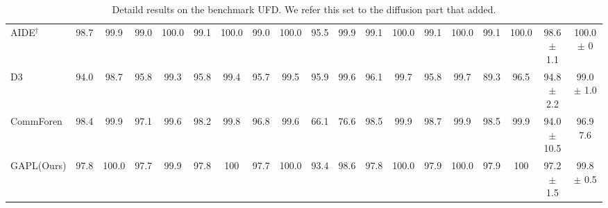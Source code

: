 \begin{table}[!t]
{\begin{tabular}{l cc cc cc cc cc cc cc cc cc}
AIDE$^\dagger$ \cite{yan2024sanity} & 98.7 & 99.9 & 99.0 & 100.0 & 99.1 & 100.0 & 99.0 & 100.0 & 95.5 & 99.9 & 99.1 & 100.0 & 99.1 & 100.0 & 99.1 & 100.0 & 98.6 $\pm$ 1.1 & 100.0 $\pm$ 0 \\
D3 \cite{yang2025d3} & 94.0 & 98.7 & 95.8 & 99.3 & 95.8 & 99.4 & 95.7 & 99.5 & 95.9 & 99.6 & 96.1 & 99.7 & 95.8 & 99.7 & 89.3 & 96.5 & 94.8 $\pm$ 2.2& 99.0 $\pm$ 1.0 \\
CommForen \cite{park2025commfor} & 98.4 & 99.9 & 97.1 & 99.6 & 98.2 & 99.8 & 96.8 & 99.6 & 66.1 & 76.6 & 98.5 & 99.9 & 98.7 & 99.9 & 98.5 & 99.9 & 94.0 $\pm$ 10.5 & 96.9 7.6 \\
\rowcolor{cvprblue!20} 
GAPL(Ours) & 97.8 & 100.0 & 97.7 & 99.9 & 97.8 & 100 & 97.7 & 100.0 &  93.4 & 98.6 &  97.8 & 100.0 & 97.9 & 100.0 & 97.9 & 100 & 97.2 $\pm$ 1.5  & 99.8 $\pm$ 0.5 \\
\bottomrule
\end{tabular}
}
\caption{Detaild results on the benchmark UFD. We refer this set to the diffusion part that \cite{ojha2023towards} added. }
\label{tab:UFD}
\end{table}


